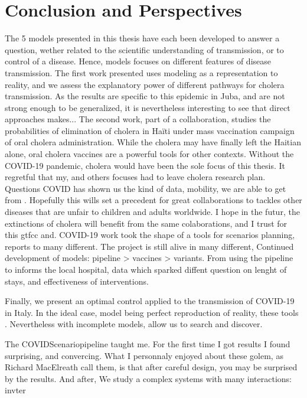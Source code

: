 \chapter{Conclusion and Perspectives}
The 5 models presented in this thesis have each been developed to answer a question, wether related to the scientific understanding of transmission, or to control of a disease. Hence, models focuses on different features of disease transmission. 
The first work presented uses modeling as a representation to reality, and we assess the explanatory power of different pathways for cholera transmission. As the results are  specific to this epidemic in Juba, and are not strong enough to be generalized, it is nevertheless interesting to see that direct approaches makes... The second work, part of a collaboration, studies the probabilities of elimination of cholera in Haïti under mass vaccination campaign of oral cholera administration. While the cholera may have finally left the Haitian alone, oral cholera vaccines are a powerful tools for other contexts.
Without the COVID-19 pandemic, cholera would have been the sole focus of this thesis. It regretful that my, and others focuses had to leave cholera research plan. Questions 
 COVID has shown us the kind of data, mobility, we are able to get from . Hopefully this wills set a precedent for great collaborations to tackles other diseases that are unfair to children and adults worldwide.  I hope in the futur, the extinctions of cholera will benefit from the same colaborations, and I trust for this gtfcc and.
 COVID-19 work took the shape of a tools for scenarios planning, reports to many different. The project is still alive in many different, Continued development of models: pipeline > vaccines > variants.
From using the pipeline to informs the local hospital, data which sparked diffent question on lenght of stays, and effectiveness of interventions.

Finally, we present an optimal control applied to the transmission of COVID-19 in Italy. In the ideal case, model being perfect reproduction of reality, these tools . Nevertheless with incomplete models, allow us to search and discover. 

The COVIDScenariopipeline taught me. For the first time I got results I found surprising, and convercing.  What I personnaly enjoyed about these golem, as Richard MacElreath call them, is that after careful design, you may be surprised by the results. And after,
We study a complex systems with many interactions: invter



